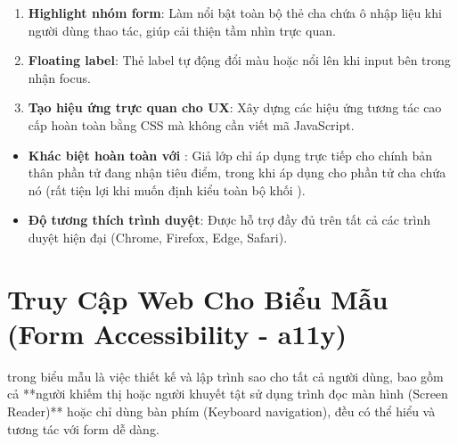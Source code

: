 \begin{tipBox}
\begin{enumerate}[leftmargin=1.5em, itemsep=4pt, parsep=0pt]
    \item \textbf{Highlight nhóm form}: Làm nổi bật toàn bộ thẻ cha chứa ô nhập liệu khi người dùng thao tác, giúp cải thiện tầm nhìn trực quan.
    \item \textbf{Floating label}: Thẻ label tự động đổi màu hoặc nổi lên khi input bên trong nhận focus.
    \item \textbf{Tạo hiệu ứng trực quan cho UX}: Xây dựng các hiệu ứng tương tác cao cấp hoàn toàn bằng CSS mà không cần viết mã JavaScript.
\end{enumerate}
\end{tipBox}

\begin{warnBox}
\begin{itemize}[leftmargin=1.5em, itemsep=4pt, parsep=0pt]
    \item \textbf{Khác biệt hoàn toàn với }: Giả lớp  chỉ áp dụng trực tiếp cho chính bản thân phần tử đang nhận tiêu điểm, trong khi  áp dụng cho phần tử cha chứa nó (rất tiện lợi khi muốn định kiểu toàn bộ khối ).
    \item \textbf{Độ tương thích trình duyệt}: Được hỗ trợ đầy đủ trên tất cả các trình duyệt hiện đại (Chrome, Firefox, Edge, Safari).
\end{itemize}
\end{warnBox}


\section{Truy Cập Web Cho Biểu Mẫu (Form Accessibility - a11y)}
\label{sec:form_accessibility}

\begin{conceptBox}
 trong biểu mẫu là việc thiết kế và lập trình sao cho tất cả người dùng, bao gồm cả **người khiếm thị hoặc người khuyết tật sử dụng trình đọc màn hình (Screen Reader)** hoặc chỉ dùng bàn phím (Keyboard navigation), đều có thể hiểu và tương tác với form dễ dàng.
\end{conceptBox}


